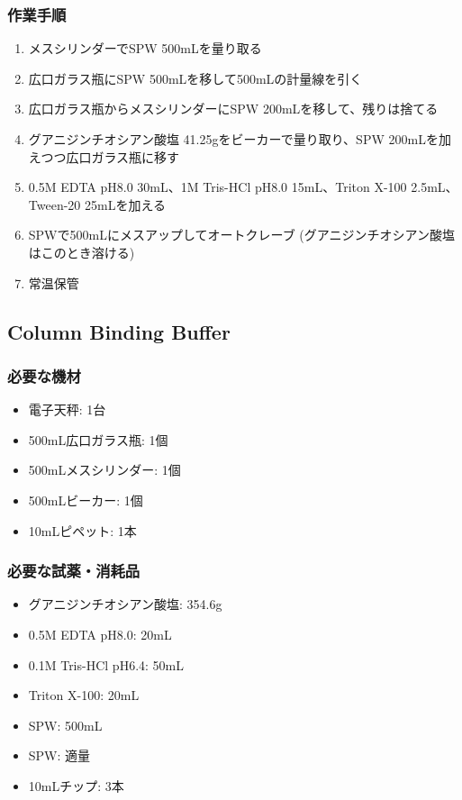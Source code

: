 \documentclass[titlepage,10pt,a4paper,uplatex]{jsbook}
\begin{document}
\subsubsection{作業手順}
\begin{enumerate}
\item メスシリンダーでSPW 500mLを量り取る
\item 広口ガラス瓶にSPW 500mLを移して500mLの計量線を引く
\item 広口ガラス瓶からメスシリンダーにSPW 200mLを移して、残りは捨てる
\item グアニジンチオシアン酸塩 41.25gをビーカーで量り取り、SPW 200mLを加えつつ広口ガラス瓶に移す
\item 0.5M EDTA pH8.0 30mL、1M Tris-HCl pH8.0 15mL、Triton X-100 2.5mL、Tween-20 25mLを加える
\item SPWで500mLにメスアップしてオートクレーブ (グアニジンチオシアン酸塩はこのとき溶ける)
\item 常温保管
\end{enumerate}

\subsection{Column Binding Buffer}

\subsubsection{必要な機材}
\begin{itemize}
\item 電子天秤: 1台
\item 500mL広口ガラス瓶: 1個
\item 500mLメスシリンダー: 1個
\item 500mLビーカー: 1個
\item 10mLピペット: 1本
\end{itemize}

\subsubsection{必要な試薬・消耗品}
\begin{itemize}
\item グアニジンチオシアン酸塩: 354.6g
\item 0.5M EDTA pH8.0: 20mL
\item 0.1M Tris-HCl pH6.4: 50mL
\item Triton X-100: 20mL
\item SPW: 500mL
\item SPW: 適量
\item 10mLチップ: 3本
\end{itemize}
\end{document}
